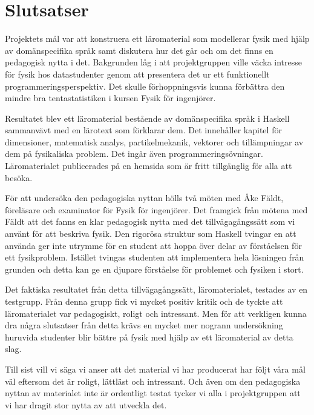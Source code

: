 
\chapter{Slutsatser}

Projektets mål var att konstruera ett läromaterial som modellerar fysik med
hjälp av domänspecifika språk samt diskutera hur  det går och om det finns en
pedagogisk nytta i det. Bakgrunden låg i att projektgruppen ville väcka intresse
för fysik hos datastudenter genom att presentera det ur ett funktionellt
programmeringsperspektiv. Det skulle förhoppningsvis kunna förbättra den mindre
bra tentastatistiken i kursen Fysik för ingenjörer.

Resultatet blev ett läromaterial bestående av domänspecifika språk i Haskell
sammanvävt med en lärotext som förklarar dem. Det innehåller kapitel för
dimensioner, matematisk analys, partikelmekanik, vektorer och tillämpningar av
dem på fysikaliska problem. Det ingår även programmeringsövningar.
Läromaterialet publicerades på en hemsida som är fritt tillgänglig för alla att
besöka.

För att undersöka den pedagogiska nyttan hölls två möten med Åke Fäldt, föreläsare och examinator för Fysik
för ingenjörer. Det framgick från mötena med Fäldt att det fanns en klar
pedagogisk nytta med det tillvägagångssätt som vi använt för att beskriva fysik.
Den rigorösa struktur som Haskell tvingar en att använda ger inte utrymme för en
student att hoppa över delar av förståelsen för ett fysikproblem. Istället
tvingas studenten att implementera hela lösningen från grunden och detta kan
ge en djupare förståelse för problemet och fysiken i stort. 

Det faktiska resultatet från detta tillvägagångssätt, läromaterialet,
testades av en testgrupp. Från denna grupp fick vi mycket positiv kritik och de
tyckte att läromaterialet var pedagogiskt, roligt och intressant. Men för att
verkligen kunna dra några slutsatser från detta krävs en mycket mer nogrann
undersökning huruvida studenter blir bättre på fysik med hjälp av ett
läromaterial av detta slag.

Till sist vill vi säga vi anser att det material vi har producerat har följt våra mål väl eftersom det är roligt, lättläst och intressant. Och även om den pedagogiska nyttan av materialet inte är ordentligt testat tycker vi alla i projektgruppen att vi har dragit stor nytta av att utveckla det.
